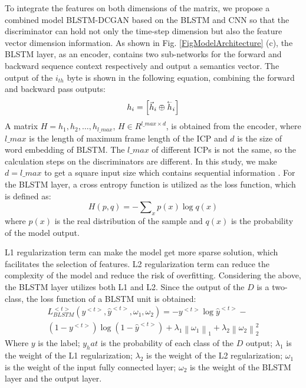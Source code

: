 To integrate the features on both dimensions of the matrix, we propose a combined model BLSTM-DCGAN based on the BLSTM and CNN so that the discriminator can hold not only the time-step dimension but also the feature vector dimension information. As shown in Fig. \ref{FigModelArchitecture} (c), the BLSTM layer, as an encoder, contains two sub-networks for the forward and backward sequence context respectively and output a semantics vector. The output of the $i_{th}$ byte is shown in the following equation, combining the forward and backward pass outputs:
\begin{equation}
{h_i} = \left[ {{{\vec h}_i} \oplus {{\mathord{\buildrel{\lower3pt\hbox{$\scriptscriptstyle\leftarrow$}} 
				\over h} }_i}} \right]
\end{equation}
A matrix $H = {h_1, h_2, …, h_{l\_max}}$, $ H \in R^{l\_max \times d}$, is obtained from the encoder, where $l\_max$ is the length of maximum frame length of the ICP and $d$ is the size of word embedding of BLSTM. The $l\_max$ of different ICPs is not the same, so the calculation steps on the discriminators are different. In this study, we make $d = l\_max$ to get a square input size which contains sequential information \cite{zhou2016text}. For the BLSTM layer, a cross entropy function is utilized as the loss function, which is defined as:
\begin{equation}
H(p,q) =  - \sum\nolimits_x {p(x)\log q(x)} 
\end{equation}
where $p(x)$ is the real distribution of the sample and $q(x)$ is the probability of the model output. 

L1 regularization term can make the model get more sparse solution, which facilitates the selection of features. L2 regularization term can reduce the complexity of the model and reduce the risk of overfitting. Considering the above, the BLSTM layer utilizes both L1 and L2. Since the output of the $D$ is a two-class, the loss function of a BLSTM unit is obtained:
\begin{equation}
\begin{array}{l}
L_{BLSTM}^{ < t > }({y^{ < t > }},{{\hat y}^{ < t > }},{\omega _1},{\omega _2}) =  - {y^{ < t > }}\log {{\hat y}^{ < t > }} - \\
(1 - {y^{ < t > }})\log (1 - {{\hat y}^{ < t > }}) + {\lambda _1}{\left\| {{\omega _1}} \right\|_1} + {\lambda _2}\left\| {{\omega _2}} \right\|_2^2
\end{array}
\end{equation}
Where $y$ is the label; $y_hat$ is the probability of each class of the $D$ output; ${\lambda _1}$ is the weight of the L1 regularization; ${\lambda _2}$ is the weight of the L2 regularization; ${\omega _1}$ is the weight of the input fully connected layer; ${\omega _2}$ is the weight of the BLSTM layer and the output layer.

